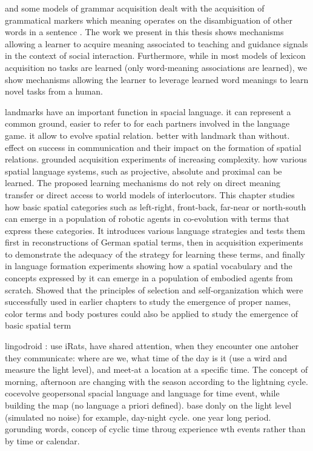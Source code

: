 and some models of grammar acquisition dealt with the acquisition of grammatical markers which meaning operates on the disambiguation of other words in a sentence \cite{steels2012fluid}. The work we present in this thesis shows mechanisms allowing a learner to acquire meaning associated to teaching and guidance signals in the context of social interaction. Furthermore, while in most models of lexicon  acquisition no tasks are learned (only word-meaning associations are learned), we show mechanisms allowing the learner to leverage learned word meanings to learn novel tasks from a human.


\cite{spranger2013evolutionary} landmarks have an important function in spacial language. it can represent a common ground, easier to refer to for each partners involved in the language game. it allow to evolve spatial relation. better with landmark than without. effect on success in communication and their impact on the
formation of spatial relations.
\cite{spranger2012emergent} \cite{spranger2013grounded} grounded acquisition experiments of increasing complexity. how various spatial language systems, such as projective, absolute and proximal can be learned. The proposed learning mechanisms do not rely on direct meaning transfer or direct access to world models of interlocutors.
\cite{spranger2012co} This chapter studies how basic spatial categories such as left-right, front-back, far-near or north-south can emerge in a population of robotic agents in co-evolution with terms that express these categories. It introduces various language strategies and tests them first in reconstructions of German spatial terms, then in acquisition experiments to demonstrate the adequacy of the strategy for learning these terms, and finally in language formation experiments showing how a spatial vocabulary and the concepts expressed by it can emerge in a population of embodied agents from scratch. Showed that the principles of selection and self-organization which were successfully used in earlier chapters to study the emergence of proper names, color terms and body postures could also be applied to study the emergence of basic spatial term

lingodroid \cite{schulz2010robots} : use iRats, have shared attention, when they encounter one antoher they communicate: where are we, what time of the day is it (use a wird and measure the light level), and meet-at a location at a specific time. The concept of morning, afternoon are changing with the season according to the lightning cycle. \cite{schulz2011lingodroids}
\cite{heath2012long} cocevolve geopersonal spacial language and language for time event, while building the map (no language a priori defined). base donly on the light level (simulated no noise) for example, day-night cycle. one year long period. gorunding words, concep of cyclic time throug experience wth events rather than by time or calendar.


